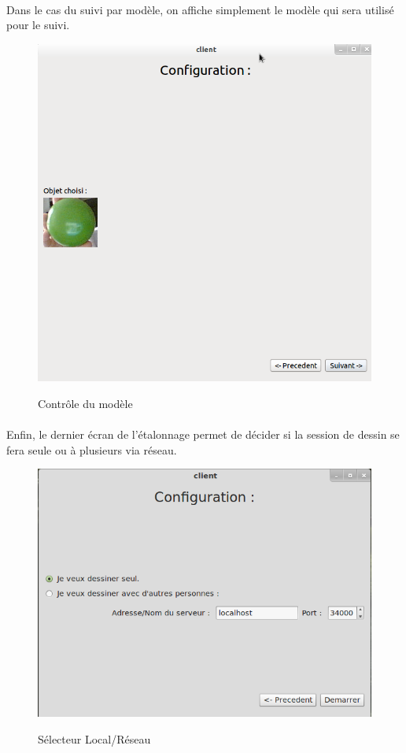 \documentclass{report}
\begin{document}
				\paragraph{}
				Dans le cas du suivi par modèle, on affiche simplement le modèle qui sera utilisé pour le suivi.
				\begin{figure}[!h]
						\centering
						\includegraphics[scale=0.35]{../images/Capture7.png}\\
						\caption{Contrôle du modèle}
						\label{Contrôle du modèle}
				\end{figure}
				\newpage
				\paragraph{}
				Enfin, le dernier écran de l'étalonnage permet de décider si la session de dessin se fera seule ou à plusieurs via réseau.
				\begin{figure}[!h]
						\centering
						\includegraphics[scale=0.4]{../images/capture_choix.png}\\
						\caption{Sélecteur Local/Réseau}
						\label{Sélecteur Local/Réseau}
				\end{figure}
\end{document}
